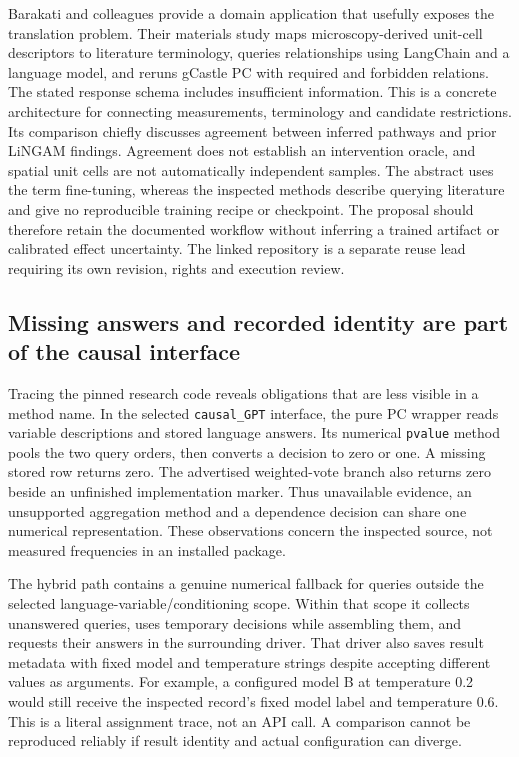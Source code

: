 Barakati and colleagues provide a domain application that usefully
exposes the translation problem. Their materials study maps
microscopy-derived unit-cell descriptors to literature terminology,
queries relationships using LangChain and a language model, and reruns
gCastle PC with required and forbidden relations. The stated response
schema includes insufficient information. This is a concrete
architecture for connecting measurements, terminology and candidate
restrictions. Its comparison chiefly discusses agreement between
inferred pathways and prior LiNGAM findings. Agreement does not
establish an intervention oracle, and spatial unit cells are not
automatically independent samples. The abstract uses the term
fine-tuning, whereas the inspected methods describe querying literature
and give no reproducible training recipe or checkpoint. The proposal
should therefore retain the documented workflow without inferring a
trained artifact or calibrated effect uncertainty. The linked repository
is a separate reuse lead requiring its own revision, rights and
execution review. \citep{exec14_iid_materials}

\hypertarget{missing-answers-and-recorded-identity-are-part-of-the-causal-interface}{%
\subsection{Missing answers and recorded identity are part of the causal
interface}\label{missing-answers-and-recorded-identity-are-part-of-the-causal-interface}}

Tracing the pinned research code reveals obligations that are less
visible in a method name. In the selected \texttt{causal\_GPT}
interface, the pure PC wrapper reads variable descriptions and stored
language answers. Its numerical \texttt{pvalue} method pools the two
query orders, then converts a decision to zero or one. A missing stored
row returns zero. The advertised weighted-vote branch also returns zero
beside an unfinished implementation marker. Thus unavailable evidence,
an unsupported aggregation method and a dependence decision can share
one numerical representation. These observations concern the inspected
source, not measured frequencies in an installed package.
\citep{exec14_iid_gpt}

The hybrid path contains a genuine numerical fallback for queries
outside the selected language-variable/conditioning scope. Within that
scope it collects unanswered queries, uses temporary decisions while
assembling them, and requests their answers in the surrounding driver.
That driver also saves result metadata with fixed model and temperature
strings despite accepting different values as arguments. For example, a
configured model B at temperature 0.2 would still receive the inspected
record's fixed model label and temperature 0.6. This is a literal
assignment trace, not an API call. A comparison cannot be reproduced
reliably if result identity and actual configuration can diverge.
\citep{exec14_iid_gpt}

